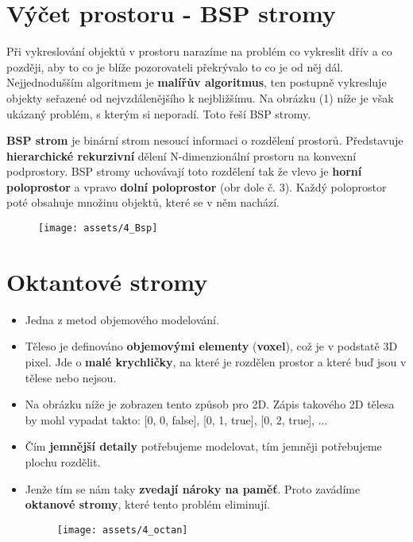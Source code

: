 \section{Výčet prostoru - BSP stromy}
Při vykreslování objektů v prostoru narazíme na problém co vykreslit dřív a co později, aby to co je blíže pozorovateli překrývalo to co je od něj dál. Nejjednodušším algoritmem je \textbf{malířův algoritmus}, ten postupně vykresluje objekty seřazené od nejvzdálenějšího k nejbližšímu. Na obrázku (1) níže je však ukázaný problém, s kterým si neporadí. Toto řeší BSP stromy.

\textbf{BSP strom} je binární strom nesoucí informaci o rozdělení prostorů. Představuje \textbf{hierarchické rekurzivní} dělení N-dimenzionální prostoru na konvexní podprostory. BSP stromy uchovávají toto rozdělení tak že vlevo je \textbf{horní poloprostor} a vpravo \textbf{dolní poloprostor} (obr dole č. 3). Každý poloprostor poté obsahuje množinu objektů, které se v něm nachází.

\begin{figure}[H]
    \centering
    \texttt{[image: assets/4\_Bsp]}
\end{figure}

\section{Oktantové stromy}
\begin{itemize}
    \item Jedna z metod objemového modelování.
    \item Těleso je definováno \textbf{objemovými elementy} (\textbf{voxel}), což je v podstatě 3D pixel. Jde o \textbf{malé krychličky}, na které je rozdělen prostor a které buď jsou v tělese nebo nejsou.
    \item Na obrázku níže je zobrazen tento způsob pro 2D. Zápis takového 2D tělesa by mohl vypadat takto: [0, 0, false], [0, 1, true], [0, 2, true], ...
    \item Čím \textbf{jemnější detaily} potřebujeme modelovat, tím jemněji potřebujeme plochu rozdělit.
    \item Jenže tím se nám taky \textbf{zvedají nároky na paměť}. Proto zavádíme \textbf{oktanové stromy}, které tento problém eliminují.
          \begin{figure}[H]
              \centering
              \texttt{[image: assets/4\_octan]}
          \end{figure}
\end{itemize}

